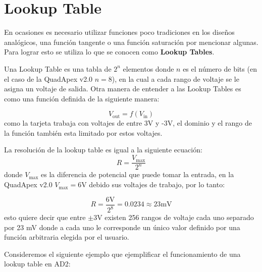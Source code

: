 	\section{Lookup Table}
	
	En ocasiones es necesario utilizar funciones poco tradiciones en los diseños analógicos, una función tangente o una función saturación por mencionar algunas. Para lograr esto se utiliza lo que se conocen como \textbf{Lookup Tables}.
		
		Una Lookup Table es una tabla de $2^{n}$ elementos donde $n$ es el número de bits (en el caso de la QuadApex v2.0 $n = 8$), en la cual a cada rango de voltaje se le asigna un voltaje de salida. Otra manera de entender a las Lookup Tables es como una función definida de la siguiente manera:
	
	\begin{equation}
		V_{\textrm{out}} = f \left( V_{\textrm{in}} \right)
	\end{equation}
	como la tarjeta trabaja con voltajes de entre 3V y -3V, el dominio y el rango de la función también esta limitado por estos voltajes.
	
	La resolución de la lookup table es igual a la siguiente ecuación:
		\begin{equation}
			R = \frac{V_{\textrm{max}}}{2^{n} }
		\end{equation}
	donde $V_{\textrm{max}}$ es la diferencia de potencial que puede tomar la entrada, en la QuadApex v2.0 $V_{\textrm{max}} = 6$V debido sus voltajes de trabajo, por lo tanto:
	
	\begin{equation}
		R = \frac{6\textrm{V}}{2^{8}} = 0.0234 \approx 23 \textrm{mV}
	\end{equation}
	esto quiere decir que entre $\pm$3V existen 256 rangos de voltaje cada uno separado por 23 mV donde a cada uno le corresponde un único valor definido por una función arbitraria elegida por el usuario.

	Consideremos el siguiente ejemplo que ejemplificar el funcionamiento de una lookup table en AD2:
		
